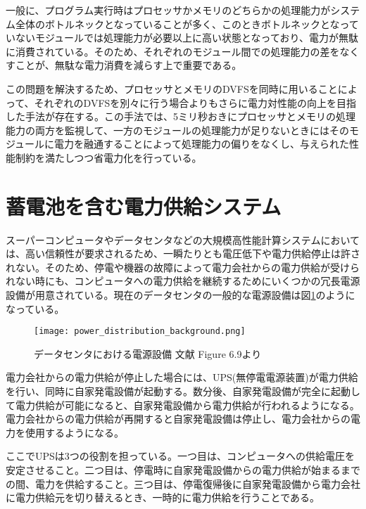一般に、プログラム実行時はプロセッサかメモリのどちらかの処理能力がシステム全体のボトルネックとなっていることが多く、このときボトルネックとなっていないモジュールでは処理能力が必要以上に高い状態となっており、電力が無駄に消費されている。そのため、それぞれのモジュール間での処理能力の差をなくすことが、無駄な電力消費を減らす上で重要である。

この問題を解決するため、プロセッサとメモリのDVFSを同時に用いることによって、それぞれのDVFSを別々に行う場合よりもさらに電力対性能の向上を目指した手法が存在する\cite{6493615}。この手法では、5ミリ秒おきにプロセッサとメモリの処理能力の両方を監視して、一方のモジュールの処理能力が足りないときにはそのモジュールに電力を融通することによって処理能力の偏りをなくし、与えられた性能制約を満たしつつ省電力化を行っている。



\section{蓄電池を含む電力供給システム}
\label{sec:ups}

スーパーコンピュータやデータセンタなどの大規模高性能計算システムにおいては、高い信頼性が要求されるため、一瞬たりとも電圧低下や電力供給停止は許されない。そのため、停電や機器の故障によって電力会社からの電力供給が受けられない時にも、コンピュータへの電力供給を継続するためにいくつかの冗長電源設備が用意されている。現在のデータセンタの一般的な電源設備は図\ref{fig:power_distribution_background}のようになっている。
\begin{figure}[t]
 \begin{center}
  \texttt{[image: power\_distribution\_background.png]}
 \end{center}
 \caption{データセンタにおける電源設備 文献\cite{Hennessy:2011:CAF:1999263} Figure 6.9より}
 \label{fig:power_distribution_background}
\end{figure}

電力会社からの電力供給が停止した場合には、UPS(無停電電源装置)が電力供給を行い、同時に自家発電設備が起動する。数分後、自家発電設備が完全に起動して電力供給が可能になると、自家発電設備から電力供給が行われるようになる。電力会社からの電力供給が再開すると自家発電設備は停止し、電力会社からの電力を使用するようになる。

ここでUPSは3つの役割を担っている。一つ目は、コンピュータへの供給電圧を安定させること。二つ目は、停電時に自家発電設備からの電力供給が始まるまでの間、電力を供給すること。三つ目は、停電復帰後に自家発電設備から電力会社に電力供給元を切り替えるとき、一時的に電力供給を行うことである。

